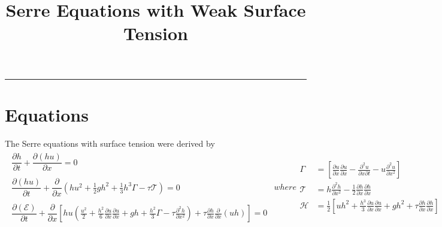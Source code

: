 \documentclass[10pt]{elsarticle}
\title{Serre Equations with Weak Surface Tension}
\begin{document}
\maketitle

\vspace{-0.3in}
\noindent
\rule{\linewidth}{0.4pt}

\tableofcontents

\section{Equations}
The Serre equations with surface tension were derived by \cite{Mitsotakis-etal-2017-1719}
\begin{subequations}
	\begin{align}
	\begin{split}
	\dfrac{\partial h}{\partial t} + \dfrac{\partial (hu)}{\partial x} = 0
	\label{eq:gSGNh}
	\end{split}\\
	\begin{split}
	\dfrac{\partial (hu)}{\partial t} + \dfrac{\partial }{\partial x} \left( hu^2 + \frac{1}{2}gh^2 + \frac{1}{3} h^3 \Gamma  - \tau \mathcal{T}\right)= 0
	\label{eq:gSGNuh}
	\end{split}\\
	\begin{split}
	\dfrac{\partial\left(\mathcal{E}\right)}{\partial t} +\dfrac{\partial}{\partial x}\left[hu \left(\frac{u^2}{2} + \frac{h^2}{6}\frac{\partial u}{\partial x}\frac{\partial u}{\partial x} + gh + \frac{h^2}{3} \Gamma - \tau \frac{\partial^2 h}{\partial x^2} \right) + \tau \frac{\partial h}{\partial x} \frac{\partial }{\partial x}\left(uh\right) \right] = 0
	\label{eq:gSGNE}
	\end{split}
	\end{align}
	where
	\begin{align}
	\Gamma &= \left[\frac{\partial u}{\partial x}\frac{\partial u}{\partial x} - \frac{\partial^2 u}{\partial x \partial t} - u\frac{\partial^2 u}{\partial x^2}\right]\\
	\mathcal{T} &= h \frac{\partial^2 h}{\partial x^2} - \frac{1}{2}\frac{\partial h}{\partial x}\frac{\partial h}{\partial x}\\
	\mathcal{H} &=  \frac{1}{2} \left[uh^2 +  \frac{h^3}{3} \frac{\partial u}{\partial x}\frac{\partial u}{\partial x} + g h^2 + \tau \frac{\partial h}{\partial x}\frac{\partial h}{\partial x} \right]
	\end{align}
	\label{eq:gSGN}
\end{subequations}
\end{document}
